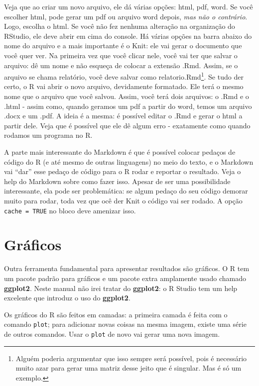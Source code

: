 \documentclass[]{book}
\let\rmarkdownfootnote\footnote%
\def\footnote{\protect\rmarkdownfootnote}
\begin{document}
Veja que ao criar um novo arquivo, ele dá várias opções: html, pdf,
word. Se você escolher html, pode gerar um pdf ou arquivo word depois,
\emph{mas não o contrário}. Logo, escolha o html. Se você não fez
nenhuma alteração na organização do RStudio, ele deve abrir em cima do
console. Há várias opções na barra abaixo do nome do arquivo e a mais
importante é o Knit: ele vai gerar o documento que você quer ver. Na
primeira vez que você clicar nele, você vai ter que salvar o arquivo: dê
um nome e não esqueça de colocar a extensão .Rmd. Assim, se o arquivo se
chama relatório, você deve salvar como relatorio.Rmd\footnote{Alguém
  poderia argumentar que isso sempre será possível, pois é necessário
  muito azar para gerar uma matriz desse jeito que é singular. Mas é só
  um exemplo.}. Se tudo der certo, o R vai abrir o novo arquivo,
devidamente formatado. Ele terá o mesmo nome que o arquivo que você
salvou. Assim, você terá dois arquivos: o .Rmd e o .html - assim como,
quando geramos um pdf a partir do word, temos um arquivo .docx e um
.pdf. A ideia é a mesma: é possível editar o .Rmd e gerar o html a
partir dele. Veja que é possível que ele dê algum erro - exatamente como
quando rodamos um programa no R.

A parte mais interessante do Markdown é que é possível colocar pedaços
de código do R (e até mesmo de outras linguagens) no meio do texto, e o
Markdown vai ``dar'' esse pedaço de código para o R rodar e reportar o
resultado. Veja o help do Markdown sobre como fazer isso. Apesar de ser
uma possibilidade interessante, ela pode ser problemática: se algum
pedaço do seu código demorar muito para rodar, toda vez que ocê der Knit
o código vai ser rodado. A opção \texttt{cache\ =\ TRUE} no bloco deve
amenizar isso.

\section{Gráficos}\label{graficos}

Outra ferramenta fundamental para apresentar resultados são gráficos. O
R tem um pacote padrão para gráficos e um pacote extra amplamente usado
chamado \textbf{ggplot2}. Neste manual não irei tratar do
\textbf{ggplot2}: o R Studio tem um help excelente que introduz o uso do
\textbf{ggplot2}.

Os gráficos do R são feitos em camadas: a primeira camada é feita com o
comando \texttt{plot}; para adicionar novas coisas na mesma imagem,
existe uma série de outros comandos. Usar o \texttt{plot} de novo vai
gerar uma nova imagem.
\end{document}
